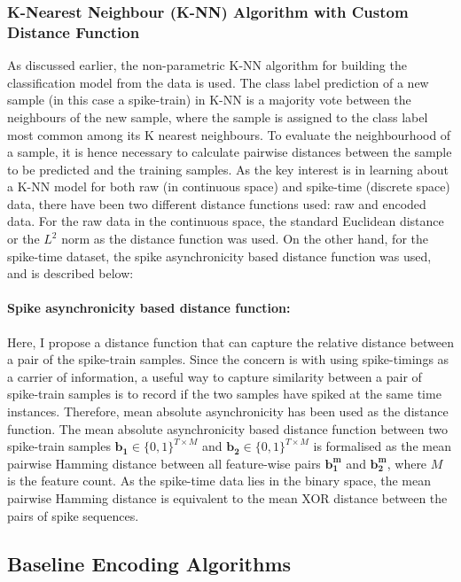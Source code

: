 \subsubsection{K-Nearest Neighbour (K-NN) Algorithm with Custom Distance Function}
\label{parag:knn_custom}
As discussed earlier, the non-parametric K-NN algorithm for building the classification model from the data is used. The class label prediction of a new sample (in this case a spike-train) in K-NN is a majority vote between the neighbours of the new sample, where the sample is assigned to the class label most common among its K nearest neighbours. To evaluate the neighbourhood of a sample, it is hence necessary to calculate pairwise distances between the sample to be predicted and the training samples. As the key interest is in learning about a K-NN model for both raw (in continuous space) and spike-time (discrete space) data, there have been two different distance functions used: raw and encoded data. For the raw data in the continuous space, the standard Euclidean distance or the $L^2$ norm as the distance function was used. On the other hand, for the spike-time dataset, the spike asynchronicity based distance function was used, and is described below:

\paragraph{Spike asynchronicity based distance function:} Here, I propose a distance function that can capture the relative distance between a pair of the spike-train samples. Since the concern is with using spike-timings as a carrier of information, a useful way to capture similarity between a pair of spike-train samples is to record if the two samples have spiked at the same time instances. Therefore, mean absolute asynchronicity has been used as the distance function. The mean absolute asynchronicity based distance function between two spike-train samples $\displaystyle \mathbf{b_1}\in \{0, 1\}^{T\times M}$ and $\displaystyle \mathbf{b_2}\in \{0, 1\}^{T\times M}$ is formalised as the mean pairwise Hamming distance between all feature-wise pairs $\mathbf{b_1^{m}}$ and $\mathbf{b_2^{m}}$, where $M$ is the feature count. As the spike-time data lies in the binary space, the mean pairwise Hamming distance is equivalent to the mean XOR distance between the pairs of spike sequences. 

\subsection{Baseline Encoding Algorithms}    

